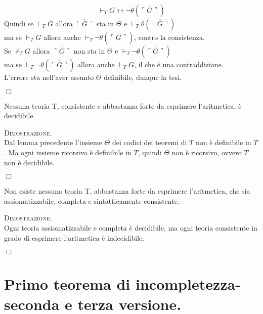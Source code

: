 	$$
	\vdash_{T} G \leftrightarrow \neg\theta(\overline{\ulcorner G \urcorner})
	$$
	Quindi se $\vdash_{T} G$ allora $\overline{\ulcorner G \urcorner}$ sta in
	$\Theta$ e $\vdash_{T} \theta(\overline{\ulcorner G \urcorner})$\\
	ma se $\vdash_{T} G$ allora anche $\vdash_{T} \neg\theta(\overline
	{\ulcorner G \urcorner})$,
	contro la consistenza.\\
	Se $\not\vdash_{T} G$ allora $\overline{\ulcorner G \urcorner}$ non sta
	in $\Theta$ e $\vdash_{T} \neg\theta(\overline{\ulcorner G \urcorner})$\\
	ma se $\vdash_{T} \neg\theta(\overline{\ulcorner G \urcorner})$ allora
	anche $\vdash_{T} G$, il che \`e una contraddizione.\\
	L'errore sta nell'aver assunto $\Theta$ definibile, dunque la tesi.
	\begin{flushright}$\Box$\end{flushright}
	
	\begin{thm}
	Nessuna teoria T, consistente e abbastanza forte da esprimere l'aritmetica,
	\`e decidibile.
	\end{thm}
	
	\textsc{Dimostrazione.}\\
	Dal lemma precedente l'insieme $\Theta$ dei codici dei teoremi di $T$ non
	\`e definibile in $T$. Ma ogni insieme ricorsivo \`e definibile in $T$,
	quindi $\Theta$ non \`e ricorsivo, ovvero $T$ non \`e decidibile.
	\begin{flushright}$\Box$\end{flushright}
	
	\begin{thm}
	Non esiste nessuna teoria T, abbastanza forte da esprimere l'aritmetica,
	che sia assiomatizzabile, completa e sintatticamente consistente.
	\end{thm}
	
	\textsc{Dimostrazione.}\\
	Ogni teoria assiomatizzabile e completa \`e decidibile, ma ogni teoria consistente
	in grado di esprimere l'aritmetica \`e indecidibile.
	\begin{flushright}$\Box$\end{flushright}
	
\section{Primo teorema di incompletezza-seconda e terza versione.}
		
